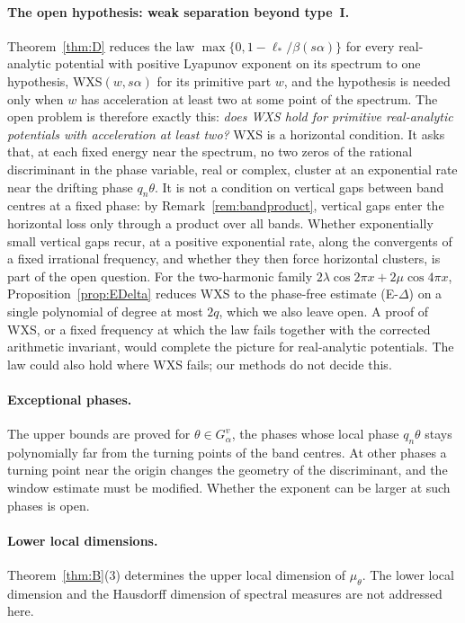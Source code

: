 \paragraph{The open hypothesis: weak separation beyond type~I.} Theorem~\ref{thm:D} reduces the law $\max\{0,1-\ell_*/\beta(s\alpha)\}$ for every real-analytic potential with positive Lyapunov exponent on its spectrum to one hypothesis, WXS$(w,s\alpha)$ for its primitive part $w$, and the hypothesis is needed only when $w$ has acceleration at least two at some point of the spectrum. The open problem is therefore exactly this: \emph{does WXS hold for primitive real-analytic potentials with acceleration at least two?} WXS is a horizontal condition. It asks that, at each fixed energy near the spectrum, no two zeros of the rational discriminant in the phase variable, real or complex, cluster at an exponential rate near the drifting phase $q_n\theta$. It is not a condition on vertical gaps between band centres at a fixed phase: by Remark~\ref{rem:bandproduct}, vertical gaps enter the horizontal loss only through a product over all bands. Whether exponentially small vertical gaps recur, at a positive exponential rate, along the convergents of a fixed irrational frequency, and whether they then force horizontal clusters, is part of the open question. For the two-harmonic family $2\lambda\cos2\pi x+2\mu\cos4\pi x$, Proposition~\ref{prop:EDelta} reduces WXS to the phase-free estimate (E-$\Delta$) on a single polynomial of degree at most $2q$, which we also leave open. A proof of WXS, or a fixed frequency at which the law fails together with the corrected arithmetic invariant, would complete the picture for real-analytic potentials. The law could also hold where WXS fails; our methods do not decide this.

\paragraph{Exceptional phases.} The upper bounds are proved for $\theta\in G^v_\alpha$, the phases whose local phase $q_n\theta$ stays polynomially far from the turning points of the band centres. At other phases a turning point near the origin changes the geometry of the discriminant, and the window estimate must be modified. Whether the exponent can be larger at such phases is open.

\paragraph{Lower local dimensions.} Theorem~\ref{thm:B}(3) determines the upper local dimension of $\mu_\theta$. The lower local dimension and the Hausdorff dimension of spectral measures are not addressed here.

